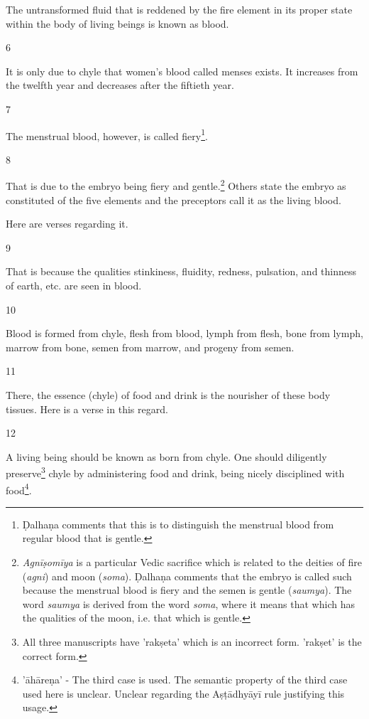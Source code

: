 \begin{translation}
The untransformed fluid that is reddened by the fire element in its proper state within the body of living beings is known as blood. %

\item [6]

It is only due to chyle that women's blood called menses exists. It increases from the twelfth year and decreases after the fiftieth year. 


\item [7]

The menstrual blood, however, is called fiery\footnote{Ḍalhaṇa comments that this is to distinguish the menstrual blood from regular blood that is gentle.}.  

\item [8]

That is due to the embryo being fiery and gentle.\footnote{\emph{Agnīṣomīya} is a particular Vedic sacrifice which is related to the deities of fire (\emph{agni}) and moon (\emph{soma}). Ḍalhaṇa comments that the embryo is called such because the menstrual blood is fiery and the semen is gentle (\emph{saumya}). The word \emph{saumya} is derived from the word \emph{soma}, where it means that which has the qualities of the moon, i.e. that which is gentle.}
Others state the embryo as constituted of the five elements and the preceptors call it as the living blood. 

Here are verses regarding it.

\item [9]

That is because the qualities stinkiness, fluidity, redness, pulsation, and thinness of earth, etc. are seen in blood.

\item [10]

Blood is formed from chyle, flesh from blood, lymph from flesh, bone from lymph, marrow from bone, semen from marrow, and progeny from semen. 

\item [11]

There, the essence (chyle) of food and drink is the nourisher of these body tissues.
Here is a verse in this regard.

\item[12]

A living being should be known as born from chyle. One should diligently preserve\footnote{All three manuscripts have 'rakṣeta' which is an incorrect form. 'rakṣet' is the correct form.} chyle by administering food and drink, being nicely disciplined with food\footnote{'āhāreṇa' - The third case is used. The semantic property of the third case used here is unclear. Unclear regarding the Aṣṭādhyāyī rule justifying this usage.}.


\end{translation}
